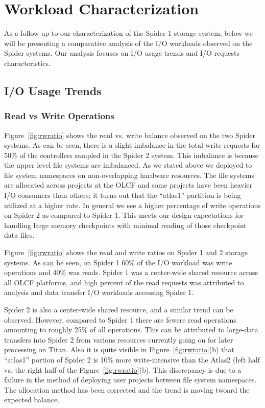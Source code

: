 \section{Workload Characterization}
\label{sec:workloadchar}

As a follow-up to our characterization of the Spider 1 storage system, below we
will be presenting a comparative analysis of the I/O workloads observed on the
Spider systems. Our analysis focuses on I/O usage trends and I/O requests
characteristics.


\subsection{I/O Usage Trends}

\subsubsection{Read vs Write Operations}


Figure~\ref{fig:rwratio} shows the read vs. write balance observed on the two
Spider systems.  As can be seen, there is a slight imbalance in the total write
requests for 50\% of the controllers sampled in the Spider 2 system. This
imbalance is because the upper level file systems are imbalanced. As we stated
above we deployed to file system namespaces on  non-overlapping hardware
resources. The file systems are allocated across projects at the OLCF and some
projects have been heavier I/O consumers than others; it turns out that the
``atlas1'' partition is being utilized at a higher rate.  In general we see a
higher percentage of write operations on Spider 2 as compared to Spider 1. This
meets our design expectations for handling large memory checkpoints with 
minimal reading of those checkpoint data files.


Figure~\ref{fig:rwratio} shows the read and write ratios on Spider 1 and 2
storage systems. As can be seen, on Spider 1 60\% of the I/O workload was write
operations and 40\% was reads. Spider 1 was a center-wide shared resource
across all OLCF platforms, and high percent of the read requests was attributed
to analysis and data transfer I/O workloads accessing Spider 1. 

Spider 2 is also a center-wide shared resource, and a similar trend can be
observed. However, compared to Spider 1 there are fewere read operations amounting
to roughly 25\% of all operations. This can be attributed to large-data
transfers into Spider 2 from various resources currently going on for later
processing on Titan. Also it is quite visible in Figure~\ref{fig:rwratio}(b)
that ``atlas1'' portion of Spider 2 is 10\% more write-intensive than the
Atlas2 (left half vs. the right half of the Figure~\ref{fig:rwratio}(b). 
This discrepancy is due to a failure in the method of deploying user projects 
between file system namespaces. The allocation method has been corrected and 
the trend is moving twoard the expected balance. 


